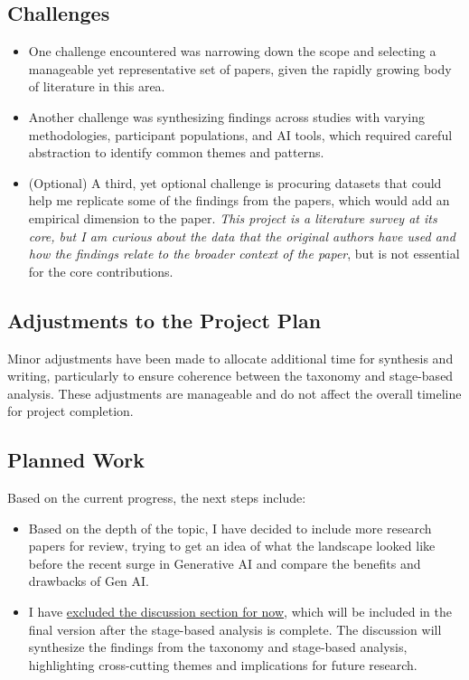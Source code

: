 \subsection*{Challenges}
\begin{itemize}
    \item One challenge encountered was narrowing down the scope and selecting a manageable yet representative set of papers, given the rapidly growing body of literature in this area.
    \item Another challenge was synthesizing findings across studies with varying methodologies, participant populations, and AI tools, which required careful abstraction to identify common themes and patterns.
    \item (Optional) A third, yet optional challenge is procuring datasets that could help me replicate some of the findings from the papers, which would add an empirical dimension to the paper. \textit{This project is a literature survey at its core, but I am curious about the data that the original authors have used and how the findings relate to the broader context of the paper}, but is not essential for the core contributions.
\end{itemize}

\subsection*{Adjustments to the Project Plan}
Minor adjustments have been made to allocate additional time for synthesis and writing, particularly to ensure coherence between the taxonomy and stage-based analysis. These adjustments are manageable and do not affect the overall timeline for project completion.

\subsection*{Planned Work}
Based on the current progress, the next steps include:
\begin{itemize}
    \item Based on the depth of the topic, I have decided to include more research papers for review, trying to get an idea of what the landscape looked like before the recent surge in Generative AI and compare the benefits and drawbacks of Gen AI.
    \item I have \uline{excluded the discussion section for now}, which will be included in the final version after the stage-based analysis is complete. The discussion will synthesize the findings from the taxonomy and stage-based analysis, highlighting cross-cutting themes and implications for future research.
\end{itemize}

